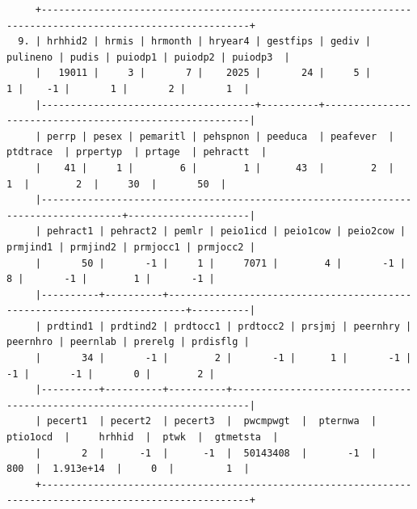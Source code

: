 \documentclass[
]{book}
\begin{document}
\begin{verbatim}
     +----------------------------------------------------------------------------------------------------------+
  9. | hrhhid2 | hrmis | hrmonth | hryear4 | gestfips | gediv | pulineno | pudis | puiodp1 | puiodp2 | puiodp3  |
     |   19011 |     3 |       7 |    2025 |       24 |     5 |        1 |    -1 |       1 |       2 |       1  |
     |-------------------------------------+----------+---------------------------------------------------------|
     | perrp | pesex | pemaritl | pehspnon | peeduca  | peafever  | ptdtrace  | prpertyp  | prtage  | pehractt  |
     |    41 |     1 |        6 |        1 |      43  |        2  |        1  |        2  |     30  |       50  |
     |------------------------------------------------------------------------------------+---------------------|
     | pehract1 | pehract2 | pemlr | peio1icd | peio1cow | peio2cow | prmjind1 | prmjind2 | prmjocc1 | prmjocc2 |
     |       50 |       -1 |     1 |     7071 |        4 |       -1 |        8 |       -1 |        1 |       -1 |
     |----------+----------+-------------------------------------------------------------------------+----------|
     | prdtind1 | prdtind2 | prdtocc1 | prdtocc2 | prsjmj | peernhry | peernhro | peernlab | prerelg | prdisflg |
     |       34 |       -1 |        2 |       -1 |      1 |       -1 |       -1 |       -1 |       0 |        2 |
     |----------+----------+----------+-------------------------------------------------------------------------|
     | pecert1  | pecert2  | pecert3  |  pwcmpwgt  |  pternwa  |  ptio1ocd  |     hrhhid  |  ptwk  |  gtmetsta  |
     |       2  |      -1  |      -1  |  50143408  |       -1  |       800  |  1.913e+14  |     0  |         1  |
     +----------------------------------------------------------------------------------------------------------+


\end{verbatim}
\end{document}
